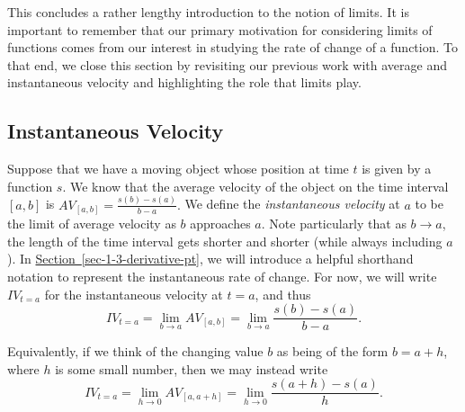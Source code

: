 \documentclass[10pt,]{book}
\theoremstyle{plain}
\theoremstyle{definition}
\theoremstyle{definition}
\theoremstyle{definition}
\theoremstyle{definition}
\theoremstyle{definition}
\numberwithin{equation}{section}
\begin{document}
\par

    This concludes a rather lengthy introduction to the notion of limits. It is important to remember that our primary motivation for considering limits of functions comes from our interest in studying the rate of change of a function. To that end, we close this section by revisiting our previous work with average and instantaneous velocity and highlighting the role that limits play.
\typeout{************************************************}
\typeout{************************************************}
\subsection[{Instantaneous Velocity}]{Instantaneous Velocity}\label{subsection-7}

  Suppose that we have a moving object whose position at time \(t\) is given by a function \(s\). We know that the average velocity of the object on the time interval \([a,b]\) is \(AV_{[a,b]} = \frac{s(b)-s(a)}{b-a}.\) We define the \emph{instantaneous velocity} \index{} at \(a\) to be the limit of average velocity as \(b\) approaches \(a\). Note particularly that as \(b \to a\), the length of the time interval gets shorter and shorter (while always including \(a\)). In \hyperref[sec-1-3-derivative-pt]{Section~\ref{sec-1-3-derivative-pt}}, we will introduce a helpful shorthand notation to represent the instantaneous rate of change. For now, we will write \(IV_{t=a}\) for the instantaneous velocity at \(t = a\), and thus
\begin{equation*}
  IV_{t=a} = \lim_{b \to a} AV_{[a,b]} = \lim_{b \to a} \frac{s(b)-s(a)}{b-a}.
  \end{equation*}\par

  Equivalently, if we think of the changing value \(b\) as being of the form \(b = a + h\), where \(h\) is some small number, then we may instead write
\begin{equation*}
  IV_{t=a} = \lim_{h \to 0} AV_{[a,a+h]} = \lim_{h \to 0} \frac{s(a+h)-s(a)}{h}.
  \end{equation*}\par
\end{document}
